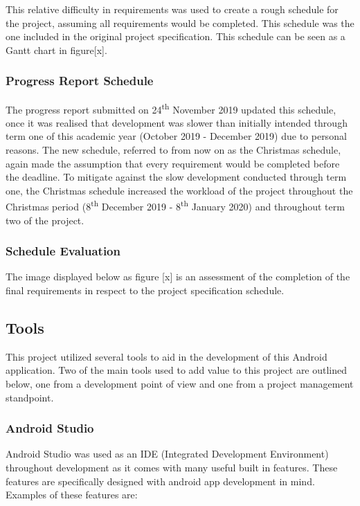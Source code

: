 \documentclass{article}
\begin{document}
This relative difficulty in requirements was used to create a rough schedule for the project, assuming all requirements would be completed. This schedule was the one included in the original project specification. This schedule can be seen as a Gantt chart in figure[x].

\subsubsection{Progress Report Schedule}

The progress report submitted on 24\textsuperscript{th} November 2019 updated this schedule, once it was realised that development was slower than initially intended through term one of this academic year (October 2019 - December 2019) due to personal reasons. The new schedule, referred to from now on as the Christmas schedule, again made the assumption that every requirement would be completed before the deadline. To mitigate against the slow development conducted through term one, the Christmas schedule increased the workload of the project throughout the Christmas period (8\textsuperscript{th} December 2019 - 8\textsuperscript{th} January 2020) and throughout term two of the project. 

\subsubsection{Schedule Evaluation}

The image displayed below as figure [x] is an assessment of the completion of the final requirements in respect to the project specification schedule. 


\subsection{Tools}

This project utilized several tools to aid in the development of this Android application. Two of the main tools used to add value to this project are outlined below, one from a development point of view and one from a project management standpoint. 

\subsubsection{Android Studio}

Android Studio was used as an IDE (Integrated Development Environment) throughout development as it comes with many useful built in features. These features are specifically designed with android app development in mind. Examples of these features are: 
\end{document}

